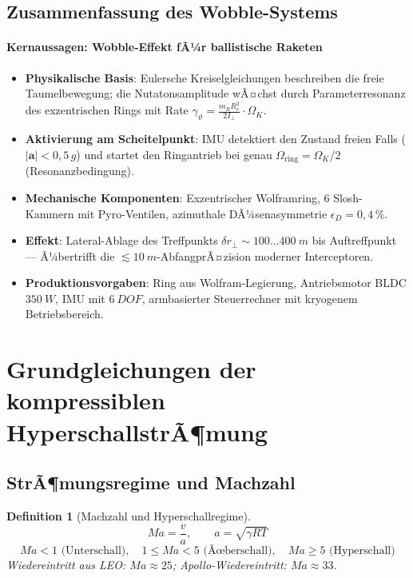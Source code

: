 ﻿\documentclass[12pt,a4paper]{article}
\newtheorem{definition}{Definition}[section]
\newcommand{\vek}[1]{\boldsymbol{#1}}
\newcommand{\Ma}{M\!a}
\begin{document}
\subsection{Zusammenfassung des Wobble-Systems}

\paragraph*{Kernaussagen: Wobble-Effekt fÃ¼r ballistische Raketen}
\begin{itemize}[leftmargin=*]
  \item \textbf{Physikalische Basis}: Eulersche Kreiselgleichungen beschreiben
    die freie Taumelbewegung; die Nutatonsamplitude wÃ¤chst durch Parameterresonanz
    des exzentrischen Rings mit Rate
    $\gamma_\vartheta = \tfrac{m_R R_e^2}{2I_\perp} \cdot \Omega_K$.
  \item \textbf{Aktivierung am Scheitelpunkt}: IMU detektiert den Zustand freien
    Falls ($|\vek{a}| < 0{,}5\,g$) und startet den Ringantrieb bei genau
    $\Omega_{\mathrm{ring}} = \Omega_K/2$ (Resonanzbedingung).
  \item \textbf{Mechanische Komponenten}: Exzentrischer Wolframring, 6 Slosh-Kammern
    mit Pyro-Ventilen, azimuthale DÃ¼senasymmetrie $\epsilon_D = 0{,}4\,\%$.
  \item \textbf{Effekt}: Lateral-Ablage des Treffpunkts
    $\delta r_\perp \sim 100\ldots\SI{400}{m}$ bis Auftreffpunkt ---
    Ã¼bertrifft die $\lesssim\SI{10}{m}$-AbfangprÃ¤zision moderner Interceptoren.
  \item \textbf{Produktionsvorgaben}: Ring aus Wolfram-Legierung,
    Antriebsmotor BLDC $\SI{350}{W}$, IMU mit $\SI{6}{DOF}$,
    armbasierter Steuerrechner mit kryogenem Betriebsbereich.
\end{itemize}

\section{Grundgleichungen der kompressiblen HyperschallstrÃ¶mung}

\subsection{StrÃ¶mungsregime und Machzahl}

\begin{definition}[Machzahl und Hyperschallregime]
\[
  \Ma = \frac{v}{a}, \qquad a = \sqrt{\gamma R T}
\]
\[
  \Ma < 1 \text{ (Unterschall)},\quad
  1 \leq \Ma < 5 \text{ (Ãœberschall)},\quad
  \Ma \geq 5 \text{ (Hyperschall)}
\]
Wiedereintritt aus LEO: $\Ma \approx 25$; Apollo-Wiedereintritt: $\Ma \approx 33$.
\end{definition}
\end{document}
